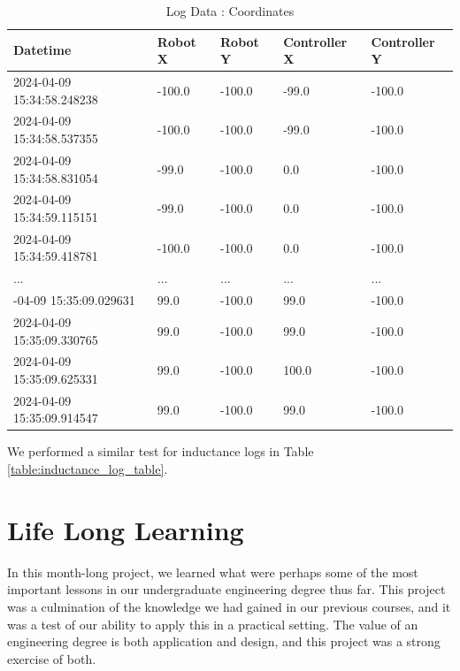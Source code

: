 \documentclass{article}
\begin{document}
\begin{table}[ht]
    \centering
    \begin{tabular}{@{}lllll@{}}
    \toprule
    \textbf{Datetime}                & \textbf{Robot X} & \textbf{Robot Y} & \textbf{Controller X} & \textbf{Controller Y} \\ \midrule
    2024-04-09 15:34:58.248238 & -100.0         & -100.0         & -99.0             & -100.0            \\
    2024-04-09 15:34:58.537355 & -100.0         & -100.0         & -99.0             & -100.0            \\
    2024-04-09 15:34:58.831054 & -99.0          & -100.0         & 0.0               & -100.0            \\
    2024-04-09 15:34:59.115151 & -99.0          & -100.0         & 0.0               & -100.0            \\
    2024-04-09 15:34:59.418781 & -100.0         & -100.0         & 0.0               & -100.0            \\ \addlinespace
    ...                            & ...            & ...            & ...               & ...               \\ \addlinespace
    2024-04-09 15:35:09.029631 & 99.0           & -100.0         & 99.0              & -100.0            \\
    2024-04-09 15:35:09.330765 & 99.0           & -100.0         & 99.0              & -100.0            \\
    2024-04-09 15:35:09.625331 & 99.0           & -100.0         & 100.0             & -100.0            \\
    2024-04-09 15:35:09.914547 & 99.0           & -100.0         & 99.0              & -100.0            \\ \bottomrule
    \end{tabular}
    \caption{Log Data : Coordinates}
    \label{table:coordinates_log_table}
\end{table}

We performed a similar test for inductance logs in Table \ref{table:inductance_log_table}.

\section{Life Long Learning}

In this month-long project, we learned what were perhaps some of the most important lessons in our undergraduate engineering degree thus far. This project was a
culmination of the knowledge we had gained in our previous courses, and it was a test of our ability to apply this in a practical setting. The value of an engineering degree
is both application and design, and this project was a strong exercise of both.
\end{document}
